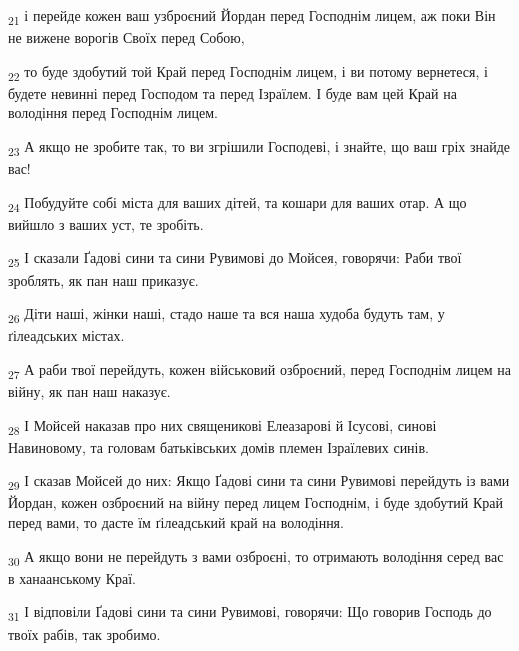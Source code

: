 \begin{tcolorbox}
\textsubscript{21} і перейде кожен ваш узброєний Йордан перед Господнім лицем, аж поки Він не вижене ворогів Своїх перед Собою,
\end{tcolorbox}
\begin{tcolorbox}
\textsubscript{22} то буде здобутий той Край перед Господнім лицем, і ви потому вернетеся, і будете невинні перед Господом та перед Ізраїлем. І буде вам цей Край на володіння перед Господнім лицем.
\end{tcolorbox}
\begin{tcolorbox}
\textsubscript{23} А якщо не зробите так, то ви згрішили Господеві, і знайте, що ваш гріх знайде вас!
\end{tcolorbox}
\begin{tcolorbox}
\textsubscript{24} Побудуйте собі міста для ваших дітей, та кошари для ваших отар. А що вийшло з ваших уст, те зробіть.
\end{tcolorbox}
\begin{tcolorbox}
\textsubscript{25} І сказали Ґадові сини та сини Рувимові до Мойсея, говорячи: Раби твої зроблять, як пан наш приказує.
\end{tcolorbox}
\begin{tcolorbox}
\textsubscript{26} Діти наші, жінки наші, стадо наше та вся наша худоба будуть там, у ґілеадських містах.
\end{tcolorbox}
\begin{tcolorbox}
\textsubscript{27} А раби твої перейдуть, кожен військовий озброєний, перед Господнім лицем на війну, як пан наш наказує.
\end{tcolorbox}
\begin{tcolorbox}
\textsubscript{28} І Мойсей наказав про них священикові Елеазарові й Ісусові, синові Навиновому, та головам батьківських домів племен Ізраїлевих синів.
\end{tcolorbox}
\begin{tcolorbox}
\textsubscript{29} І сказав Мойсей до них: Якщо Ґадові сини та сини Рувимові перейдуть із вами Йордан, кожен озброєний на війну перед лицем Господнім, і буде здобутий Край перед вами, то дасте їм ґілеадський край на володіння.
\end{tcolorbox}
\begin{tcolorbox}
\textsubscript{30} А якщо вони не перейдуть з вами озброєні, то отримають володіння серед вас в ханаанському Краї.
\end{tcolorbox}
\begin{tcolorbox}
\textsubscript{31} І відповіли Ґадові сини та сини Рувимові, говорячи: Що говорив Господь до твоїх рабів, так зробимо.
\end{tcolorbox}
